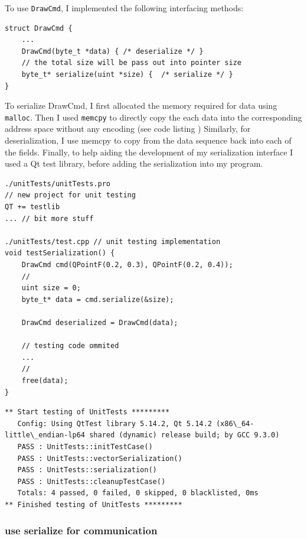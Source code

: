 \documentclass[11pt]{article}
\begin{document}
\begin{multicols*}{2}
To use \verb|DrawCmd|, I implemented the following interfacing methods:

\begin{lstlisting}
struct DrawCmd {
    ...
    DrawCmd(byte_t *data) { /* deserialize */ }
    // the total size will be pass out into pointer size
    byte_t* serialize(uint *size) {  /* serialize */ }
}
\end{lstlisting}

To serialize DrawCmd, I first allocated the memory required for data using \verb|malloc|.
Then I used \verb|memcpy| to directly copy the each data into the corresponding address space without any encoding (see code listing )
Similarly, for deserialization, I use memcpy to copy from the data sequence back into each of the fields.
Finally, to help aiding the development of my serialization interface I used a Qt test library, before adding the serialization into my program.

\begin{lstlisting}[caption={unit testing}]
./unitTests/unitTests.pro
// new project for unit testing
QT += testlib
... // bit more stuff

./unitTests/test.cpp // unit testing implementation
void testSerialization() {
    DrawCmd cmd(QPointF(0.2, 0.3), QPointF(0.2, 0.4));
    //
    uint size = 0;
    byte_t* data = cmd.serialize(&size);

    DrawCmd deserialized = DrawCmd(data);

    // testing code ommited
    ...
    //
    free(data);
}
\end{lstlisting}

\begin{lstlisting}[caption={unit testing log, it showed all tests had passed}]
** Start testing of UnitTests *********
   Config: Using QtTest library 5.14.2, Qt 5.14.2 (x86\_64-little\_endian-lp64 shared (dynamic) release build; by GCC 9.3.0)
   PASS : UnitTests::initTestCase()
   PASS : UnitTests::vectorSerialization()
   PASS : UnitTests::serialization()
   PASS : UnitTests::cleanupTestCase()
   Totals: 4 passed, 0 failed, 0 skipped, 0 blacklisted, 0ms
** Finished testing of UnitTests *********
\end{lstlisting}

\subsubsection{use serialize for communication}


\end{multicols*}
\end{document}

